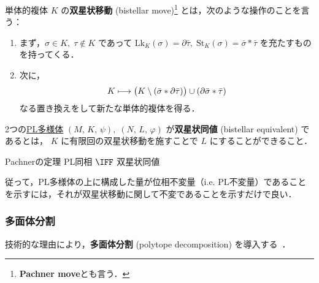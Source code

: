 \documentclass[TQFT_main]{subfiles}
\begin{document}
単体的複体 $K$ の\textbf{双星状移動} (bistellar move)\footnote{\textbf{Pachner move}とも言う．} とは，次のような操作のことを言う：
\begin{enumerate}
    \item まず，$\sigma \in K,\; \tau \notin K$ であって $\mathrm{Lk}_K (\sigma) = \partial \bar{\tau},\; \mathrm{St}_K (\sigma) = \bar{\sigma} * \bar{\tau}$ を充たすものを持ってくる．
    \item 次に，
    \begin{align}
        K \longmapsto \bigl(K \setminus (\bar{\sigma} * \partial \bar{\tau}) \bigr) \cup (\partial \bar{\sigma} * \bar{\tau})
    \end{align}
    なる置き換えをして新たな単体的複体を得る．
\end{enumerate}
2つの\hyperref[def:PLmfd]{PL多様体} $(M,\, K,\, \psi),\; (N,\, L,\, \varphi)$ が\textbf{双星状同値} (bistellar equivalent) であるとは，
$K$ に有限回の双星状移動を施すことで $L$ にすることができること．

\begin{mytheo}[label=thm:Pachner]{Pachnerの定理}
    PL同相 $\IFF$ 双星状同値
\end{mytheo}

従って，PL多様体の上に構成した量が位相不変量（i.e. PL不変量）であることを示すには，それが双星状移動に関して不変であることを示すだけで良い．

\subsubsection{多面体分割}

技術的な理由により，\textbf{多面体分割} (polytope decomposition) を導入する~\cite[p.11]{KirillovBalsam2010TVBW}．
\end{document}
